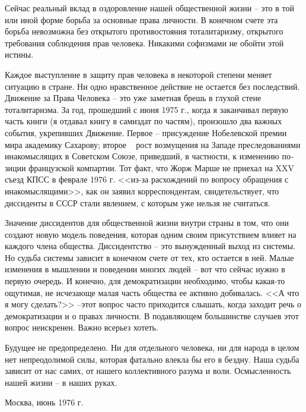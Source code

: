 \documentclass{book}
\begin{document}
Сейчас реальный вклад в оздоровление нашей общественной жизни -- это в той или иной форме борьба за основные права личности. В конечном счете эта борьба невозможна без откры­того противостояния тоталитаризму, открытого требования соблюдения прав человека. Никакими софизмами не обойти этой истины.

Каждое выступление в защиту прав человека в некоторой степени меняет ситуацию в стране. Ни одно нравственное дейст­вие не остается без последствий. Движение за Права Человека -- это уже заметная брешь в глухой стене тоталитаризма. За год, прошедший с июня 1975 г., когда я заканчивал первую часть книги (я отдавал книгу в самиздат по частям), произошло два важных события, укрепивших Движение. Первое -- присужде­ние Нобелевской премии мира академику Сахарову; второе ~ рост возмущения на Западе преследованиями инакомыслящих в Советском Союзе, приведший, в частности, к изменению по­зиции французской компартии. Тот факт, что Жорж Марше не приехал на XXV съезд КПСС в феврале 1976 г. <<из-за расхожде­ний по вопросу обращения с инакомыслящими>>, как он заявил корреспондентам, свидетельствует, что диссиденты в СССР стали явлением, с которым уже нельзя не считаться.

Значение диссидентов для общественной жизни внутри страны в том, что они создают новую модель поведения, которая одним своим присутствием влияет на каждого члена общества. Диссидентство -- это вынужденный выход из системы. Но судьба системы зависит в конечном счете от тех, кто остается в ней. Малые изменения в мышлении и поведении многих людей -- вот что сейчас нужно в первую очередь. И конечно, для демокра­тизации необходимо, чтобы какая-то ощутимая, не исчезающе малая часть общества ее активно добивалась. <<А что я могу сделать?>> --этот вопрос часто приходится слышать, когда заходит речь о демократизации и о правах личности. В подавляющем большинстве случаев этот вопрос неискренен. Важно всерьез хотеть. 

Будущее не предопределено. Ни для отдельного человека, ни для народа в целом нет непреодолимой силы, которая фатально влекла бы его в бездну. Наша судьба зависит от нас самих, от нашего коллективного разума и воли. Осмысленность нашей жизни -- в наших руках.



\begin{flushleft}
Москва, июнь 1976 г.  
\end{flushleft}


\newpage
\renewcommand{\cftchapdotsep}{\cftdotsep}
\tableofcontents
\end{document}
